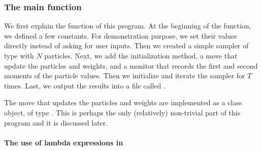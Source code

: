 \subsubsection{The main function}
\label{ssub:The main function}

We first explain the  function of this program.
At the beginning of the function, we defined a few constants. For
demonstration purpose, we set their values directly instead of asking for user
inputs. Then we created a simple sampler of type 
with $N$ particles. Next, we add the initialization method, a move that update
the particles and weights, and a monitor that records the first and second
moments of the particle values. Then we initialize and iterate the sampler for
$T$ times. Last, we output the results into a file called
.

The move that updates the particles and weights are implemented as a class
object, of type . This is perhaps the only (relatively)
non-trivial part of this program and it is discussed later.

\paragraph{The use of \cppoo lambda expressions in \vsmc}

